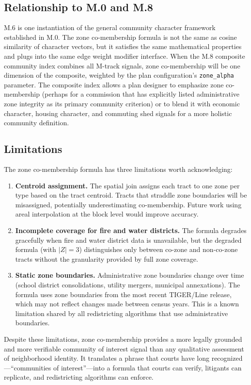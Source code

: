 \subsection{Relationship to M.0 and M.8}

M.6 is one instantiation of the general community character framework established
in M.0.
The zone co-membership formula is not the same as cosine similarity of character
vectors, but it satisfies the same mathematical properties and plugs into the
same edge weight modifier interface.
When the M.8 composite community index combines all M-track signals, zone co-membership
will be one dimension of the composite, weighted by the plan configuration's
\texttt{zone\_alpha} parameter.
The composite index allows a plan designer to emphasize zone co-membership
(perhaps for a commission that has explicitly listed administrative zone integrity
as its primary community criterion) or to blend it with economic character,
housing character, and commuting shed signals for a more holistic community
definition.

\subsection{Limitations}

The zone co-membership formula has three limitations worth acknowledging:
\begin{enumerate}
  \item \textbf{Centroid assignment.}
    The spatial join assigns each tract to one zone per type based on the tract
    centroid.
    Tracts that straddle zone boundaries will be misassigned, potentially
    underestimating co-membership.
    Future work using areal interpolation at the block level would improve accuracy.
  \item \textbf{Incomplete coverage for fire and water districts.}
    The formula degrades gracefully when fire and water district data is unavailable,
    but the degraded formula (with $|Z| = 3$) distinguishes only between
    co-zone and non-co-zone tracts without the granularity provided by
    full zone coverage.
  \item \textbf{Static zone boundaries.}
    Administrative zone boundaries change over time (school district consolidations,
    utility mergers, municipal annexations).
    The formula uses zone boundaries from the most recent TIGER/Line release,
    which may not reflect changes made between census years.
    This is a known limitation shared by all redistricting algorithms that use
    administrative boundaries.
\end{enumerate}

Despite these limitations, zone co-membership provides a more legally grounded and
more verifiable community of interest signal than any qualitative assessment of
neighborhood identity.
It translates a phrase that courts have long recognized---``communities of interest''---into
a formula that courts can verify, litigants can replicate, and redistricting
algorithms can enforce.

